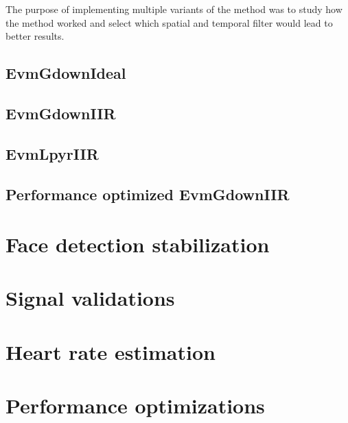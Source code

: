 The purpose of implementing multiple variants of the method was to study
how the method worked and select which spatial and temporal filter would
lead to better results.

\subsection{EvmGdownIdeal} \label{sec:impl:evm:gdownideal}

\subsection{EvmGdownIIR} \label{sec:impl:evm:gdowniir}

\subsection{EvmLpyrIIR} \label{sec:impl:evm:lpyriir}

\subsection{Performance optimized EvmGdownIIR} \label{sec:impl:evm:final}

\section{Face detection stabilization} \label{sec:impl:face}


\section{Signal validations} \label{sec:impl:validations}


\section{Heart rate estimation} \label{sec:impl:estimation}


\section{Performance optimizations} \label{sec:impl:performance}

